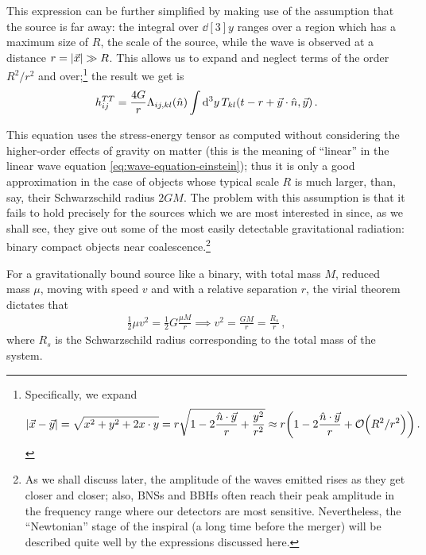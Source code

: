 \documentclass[main.tex]{subfiles}
\begin{document}
This expression can be further simplified by making use of the assumption that the source is far away: the integral over \(\dd[3]{y}\) ranges over a region which has a maximum size of \(R\), the scale of the source, while the wave is observed at a distance \(r = \abs{\vec{x}} \gg R\). 
This allows us to expand and neglect terms of the order \(R^2 / r^2\) and over;\footnote{
    Specifically, we expand 
    \begin{align}
    \abs{\vec{x} - \vec{y}} = \sqrt{x^2 + y^2 + 2 x \cdot y} 
    = r \sqrt{1 - 2 \frac{\hat{n} \cdot \vec{y}}{r} + \frac{y^2}{r^2}}
    \approx r \qty(1 - 2 \frac{\hat{n} \cdot \vec{y}}{r} + \order{R^2/ r^2})
    \,.
    \end{align}
} the result we get is 
%
\begin{align}
h_{ij}^{TT} = \frac{4 G}{r} \Lambda_{ij, kl} (\hat{n})
\int \dd[3]{y} T_{kl} \qty(t-r + \vec{y}\cdot \hat{n}, \vec{y}) 
\,.
\end{align}

This equation uses the stress-energy tensor as computed without considering the higher-order effects of gravity on matter (this is the meaning of ``linear'' in the linear wave equation \eqref{eq:wave-equation-einstein}); thus it is only a good approximation in the case of objects whose typical scale \(R\) is much larger, than, say, their Schwarzschild radius \(2GM\). 
The problem with this assumption is that it fails to hold precisely for the sources which we are most interested in since, as we shall see, they give out some of the most easily detectable gravitational radiation: binary compact objects near coalescence.\footnote{As we shall discuss later, the amplitude of the waves emitted rises as they get closer and closer; also, \acp{BNS} and \acp{BBH} often reach their peak amplitude in the frequency range where our detectors are most sensitive.
Nevertheless, the ``Newtonian'' stage of the inspiral (a long time before the merger) will be described quite well by the expressions discussed here.}

For a gravitationally bound source like a binary, with total mass \(M\), reduced mass \(\mu \), moving with speed \(v\) and with a relative separation \(r\), the virial theorem dictates that 
%
\begin{align}
\frac{1}{2} \mu v^2 = \frac{1}{2} G \frac{\mu M}{r} \implies v^2 = \frac{GM}{r} = \frac{R_s}{r} 
\,,
\end{align}
% 
where \(R_s\) is the Schwarzschild radius corresponding to the total mass of the system. 
\end{document}
